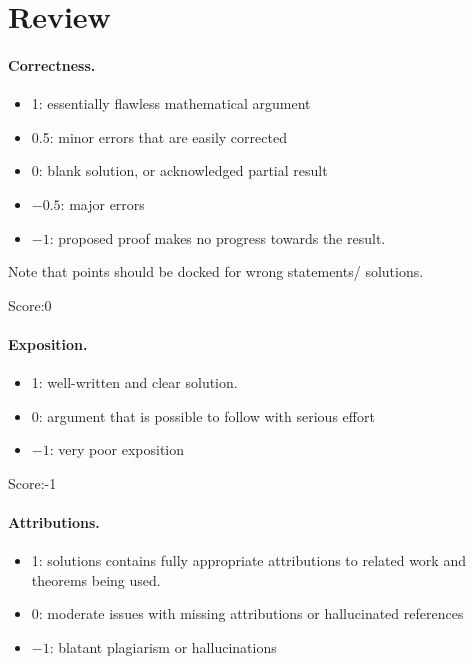 \documentclass[11pt]{article}
\theoremstyle{definition}
\theoremstyle{remark}
\begin{document}
\maketitle

\section{Review}

\paragraph{Correctness.}
\begin{itemize}
	\item  1: essentially flawless mathematical argument
	\item  0.5: minor errors that are easily corrected
	\item  0: blank solution, or acknowledged partial result
	\item  $-0.5$: major errors
	\item  $-1$: proposed proof makes no progress towards the result.
\end{itemize}
Note that points should be docked for wrong statements/ solutions.

\noindent Score:0

\paragraph{Exposition.}
\begin{itemize}
	\item  1: well-written and clear solution.
	\item  0: argument that is possible to follow with serious effort
	\item  $-1$: very poor exposition
\end{itemize}

\noindent Score:-1 

\paragraph{Attributions.}
\begin{itemize}
	\item  1: solutions contains fully appropriate attributions
		to related work and theorems being used.
	\item  0: moderate issues with missing attributions or hallucinated references
	\item  $-1$: blatant plagiarism or hallucinations
\end{itemize}
\end{document}
